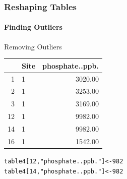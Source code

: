 \documentclass[12pt]{beamer}\usepackage[]{graphicx}\usepackage[]{color}
\makeatletter
\newcommand{\hlnum}[1]{\textcolor[rgb]{0.686,0.059,0.569}{#1}}%
\newcommand{\hlstr}[1]{\textcolor[rgb]{0.192,0.494,0.8}{#1}}%
\newcommand{\hlstd}[1]{\textcolor[rgb]{0.345,0.345,0.345}{#1}}%
\newcommand{\hlkwb}[1]{\textcolor[rgb]{0.69,0.353,0.396}{#1}}%
\newenvironment{kframe}{%
 \def\at@end@of@kframe{}%
 \ifinner\ifhmode%
  \def\at@end@of@kframe{\end{minipage}}%
  \begin{minipage}{\columnwidth}%
 \fi\fi%
 \def\FrameCommand##1{\hskip\@totalleftmargin \hskip-\fboxsep
 \colorbox{shadecolor}{##1}\hskip-\fboxsep
     \hskip-\linewidth \hskip-\@totalleftmargin \hskip\columnwidth}%
 \MakeFramed {\advance\hsize-\width
   \@totalleftmargin\z@ \linewidth\hsize
   \@setminipage}}%
 {\par\unskip\endMakeFramed%
 \at@end@of@kframe}
\newenvironment{knitrout}{}{} %
\makeatother
\begin{document}
\begin{frame}[fragile]
  \frametitle{Reshaping Tables}
  \framesubtitle{Finding Outliers}
  \begin{block}{Removing Outliers}
   \end{block}   
\begin{table}[ht]
\centering
\begin{tabular}{rlr}
  \hline
 & Site & phosphate..ppb. \\ 
  \hline
1 & 1 & 3020.00 \\ 
  2 & 1 & 3253.00 \\ 
  3 & 1 & 3169.00 \\ 
  12 & 1 & 9982.00 \\ 
  14 & 1 & 9982.00 \\ 
  16 & 1 & 1542.00 \\ 
   \hline
\end{tabular}
\end{table}

\begin{knitrout}
\color{fgcolor}\begin{kframe}
\begin{alltt}
\hlstd{table4[}\hlnum{12}\hlstd{,}\hlstr{"phosphate..ppb."}\hlstd{]}\hlkwb{<-}\hlnum{982}
\hlstd{table4[}\hlnum{14}\hlstd{,}\hlstr{"phosphate..ppb."}\hlstd{]}\hlkwb{<-}\hlnum{982}
\end{alltt}
\end{kframe}
\end{knitrout}
\end{frame}
\end{document}
